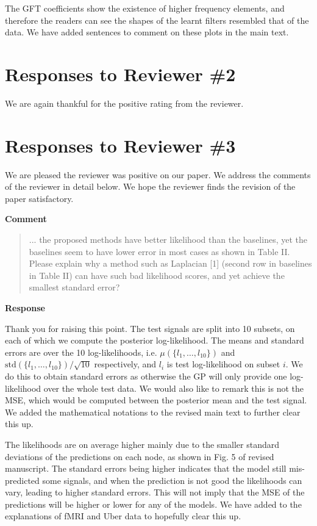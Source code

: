\documentclass[11pt,onecolumn,journal]{IEEEtran}
\begin{document}
The GFT coefficients show the existence of higher frequency elements, and therefore the readers can see the shapes of the learnt filters resembled that of the data. We have added sentences to comment on these plots in the main text.

\section*{Responses to Reviewer \#2 }

We are again thankful for the positive rating from the reviewer.

\section*{Responses to Reviewer \#3}

We are pleased the reviewer was positive on our paper. We address the comments of the reviewer in detail below. We hope the reviewer finds the revision of the paper satisfactory.

\textbf{Comment}

\begin{quote}
    ... the proposed methods have better likelihood than the baselines, yet the baselines seem to have lower error in most cases as shown in Table II. Please explain why a method such as Laplacian [1] (second row in baselines in Table II) can have such bad likelihood scores, and yet achieve the smallest standard error?
\end{quote}

\textbf{Response}

Thank you for raising this point. The test signals are split into 10 subsets, on each of which we compute the posterior log-likelihood. The means and standard errors are over the 10 log-likelihoods, i.e. $\mu(\{l_1, \dots, l_{10}\})$ and $\text{std}(\{l_1, \dots, l_{10}\})/\sqrt{10}$ respectively, and $l_i$ is test log-likelihood on subset $i$. We do this to obtain standard errors as otherwise the GP will only provide one log-likelihood over the whole test data. We would also like to remark this is not the MSE, which would be computed between the posterior mean and the test signal.
We added the mathematical notations to the revised main text to further clear this up.

The likelihoods are on average higher mainly due to the smaller standard deviations of the predictions on each node, as shown in Fig. 5 of revised manuscript. The standard errors being higher indicates that the model still mis-predicted some signals, and when the prediction is not good the likelihoods can vary, leading to higher standard errors. This will not imply that the MSE of the predictions will be higher or lower for any of the models. We have added to the explanations of fMRI and Uber data to hopefully clear this up.
\end{document}
